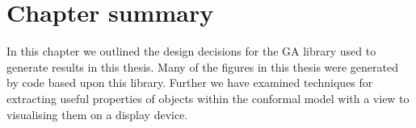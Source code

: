 \section{Chapter summary}

In this chapter we outlined the design decisions for the GA library used to
generate results in this thesis. Many of the figures in this thesis were
generated by code based upon this library.  Further we have examined
techniques for extracting useful properties of objects within the conformal
model with a view to visualising them on a display device.

